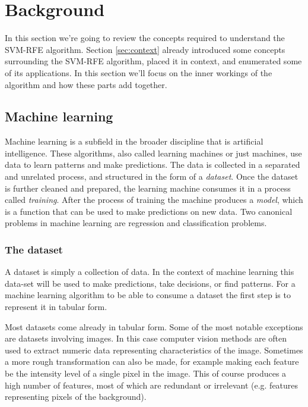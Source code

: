 \chapter{Background}
\label{Chapter4}

In this section we're going to review the concepts required to understand the SVM-RFE algorithm. Section \ref{sec:context} already introduced some concepts surrounding the SVM-RFE algorithm, placed it in context, and enumerated some of its applications. In this section we'll focus on the inner workings of the algorithm and how these parts add together. 

\section{Machine learning}

Machine learning is a subfield in the broader discipline that is artificial intelligence. These algorithms, also called learning machines or just machines, use data to learn patterns and make predictions. The data is collected in a separated and unrelated process, and structured in the form of a \emph{dataset}. Once the dataset is further cleaned and prepared, the learning machine consumes it in a process called \emph{training}. After the process of training the machine produces a \emph{model}, which is a function that can be used to make predictions on new data. Two canonical problems in machine learning are regression and classification problems.

\subsection{The dataset}

A dataset is simply a collection of data. In the context of machine learning this data-set will be used to make predictions, take decisions, or find patterns. For a machine learning algorithm to be able to consume a dataset the first step is to represent it in tabular form. 

Most datasets come already in tabular form. Some of the most notable ex\-cep\-tions are datasets involving images. In this case computer vision methods are often used to extract numeric data representing characteristics of the image. Sometimes a more rough transformation can also be made, for example making each feature be the intensity level of a single pixel in the image. This of course produces a high number of features, most of which are redundant or irrelevant (e.g. features representing pixels of the background). 

